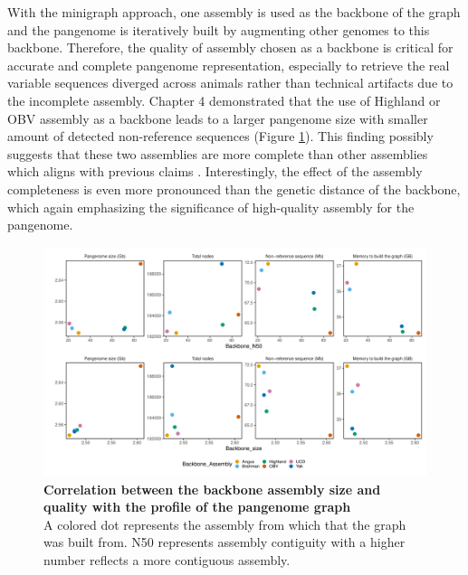 \documentclass[../main.tex]{subfiles}
\begin{document}
With the minigraph approach, one assembly is used as the backbone of the graph and the pangenome is iteratively built by augmenting other genomes to this backbone. Therefore, the quality of assembly chosen as a backbone is critical for accurate and complete pangenome representation, especially to retrieve the real variable sequences diverged across animals rather than technical artifacts due to the incomplete assembly. Chapter 4 demonstrated that the use of Highland or OBV assembly as a backbone leads to a larger pangenome size with smaller amount of detected non-reference sequences (Figure \ref{fig52:backeff}). This finding possibly suggests that these two assemblies are more complete than other assemblies which aligns with previous claims \citep{rice2020continuous}. Interestingly, the effect of the assembly completeness is even more pronounced than the genetic distance of the backbone, which again emphasizing  the significance of high-quality assembly for the pangenome.  

\begin{figure}[!htb]
   \centering
   \includegraphics[width=\textwidth]{discuss/fig52.pdf}
       \vspace{3mm}
       \caption[Correlation between the backbone assembly size and quality with the profile of the pangenome graph]{\textbf{Correlation between the backbone assembly size and quality with the profile of the pangenome graph} \\
       \footnotesize{A colored dot represents the assembly from which that the graph was built from. 
        N50 represents assembly contiguity with a higher number reflects a more contiguous assembly. 
       }}
       \label{fig52:backeff}
\end{figure}
\end{document}
